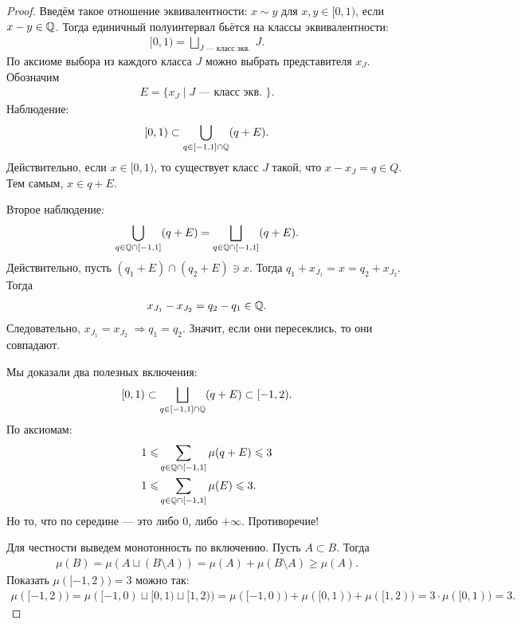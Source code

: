 \documentclass[a4paper,14pt]{extarticle}
\theoremstyle{definition}
\theoremstyle{plain}
\theoremstyle{plain}
\theoremstyle{plain}
\theoremstyle{plain}
\theoremstyle{definition}
\theoremstyle{definition}
\theoremstyle{definition}
\theoremstyle{definition}
\theoremstyle{definition}
\theoremstyle{definition}
\theoremstyle{plain}
\theoremstyle{plain}
\theoremstyle{plain}
\theoremstyle{plain}
\theoremstyle{definition}
\theoremstyle{definition}
\theoremstyle{definition}
\theoremstyle{definition}
\theoremstyle{definition}
\newcommand{\Q}{\ensuremath \mathbb{Q}}
\begin{document}
\begin{proof}
 Введём такое отношение эквивалентности: $ x \sim y $ для $ x,y \in [0, 1) $, если $ x-y \in \Q $. Тогда единичный полуинтервал бьётся на классы эквивалентности:
 \begin{align*}
  [0, 1) = \bigsqcup_{J \text{ --- класс экв. }} J
  .\end{align*} По аксиоме выбора из каждого класса $ J $ можно выбрать представителя $ x_J $. Обозначим
 \begin{align*}
  E = \{ x_J \mid J \text { --- класс экв. } \}
  .\end{align*} Наблюдение:
 \begin{align*}
  [0, 1) \subset \bigcup_{q \in [-1, 1] \cap \Q} (q + E)
  .\end{align*} Действительно, если $ x \in [0, 1) $, то существует класс $ J $ такой, что $ x - x_J = q \in Q $. Тем самым, $ x \in q + E $.

 Второе наблюдение:
 \begin{align*}
  \bigcup_{q \in \Q \cap [-1, 1]} (q + E) = \bigsqcup_{q \in \Q \cap [-1, 1]} (q + E)
  .\end{align*} Действительно, пусть $ (q_1 + E) \cap (q_2 + E) \ni x $. Тогда $ q_1 + x_{J_1} = x = q_2 + x_{J_2} $. Тогда
 \begin{align*}
  x_{J_1} - x_{J_2} = q_2 - q_1 \in \Q
  .\end{align*} Следовательно, $ x_{J_1} = x_{J_2} \;\Longrightarrow q_1 = q_2$. Значит, если они пересеклись, то они совпадают.

 Мы доказали два полезных включения:
 \begin{align*}
  [0, 1) \subset \bigsqcup_{q \in [-1, 1] \cap \Q} (q + E) \subset [-1, 2)
  .\end{align*} По аксиомам:
 \begin{align*}
  1 \leqslant & \sum_{q \in \Q \cap [-1, 1]} \mu(q + E) \leqslant 3 \\
  1 \leqslant & \sum_{q \in \Q \cap [-1, 1]} \mu(E) \leqslant 3
  .\end{align*} Но то, что по середине --- это либо $ 0 $, либо $ +\infty $. Противоречие!

 Для честности выведем монотонность по включению. Пусть $ A \subset B $. Тогда
 \begin{align*}
  \mu(B) = \mu(A \sqcup (B \setminus A)) = \mu(A) + \mu(B \setminus A) \geqslant \mu(A)
  .\end{align*} Показать $ \mu([-1, 2)) = 3 $ можно так:
 \begin{align*}
  \mu([-1, 2)) = \mu([-1, 0) \sqcup [0, 1) \sqcup [1, 2)) =\mu([-1, 0)) + \mu([0, 1)) + \mu([1, 2)) = 3 \cdot \mu([0, 1)) = 3
  .\end{align*}
\end{proof}
\end{document}
